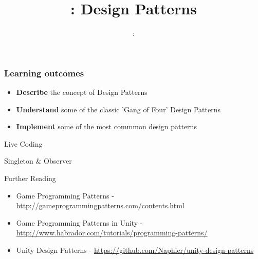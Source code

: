 \usepackage{../../beamerthemeFalmouthGamesAcademy}
\usepackage{multimedia}
\graphicspath{ {../../} }


\usepackage[normalem]{ulem}
\usepackage{wasysym}

\usepackage{pdfpages}

\usetikzlibrary{arrows,automata}




\title{\sessionnumber: Design Patterns}
\subtitle{\modulecode: \moduletitle}

\frame{\titlepage} 

\begin{frame}
	\frametitle{Learning outcomes}
	\begin{itemize}
		\item \textbf{Describe} the concept of Design Patterns
		\item \textbf{Understand} some of the classic 'Gang of Four' Design Patterns
		\item \textbf{Implement} some of the most commmon design patterns
	\end{itemize}
\end{frame}



\begin{frame}{Live Coding}
	\begin{center}
	Singleton \& Observer
	\end{center}
\end{frame}

\begin{frame}{Further Reading}
	\begin{itemize}
		\item Game Programming Patterns - \url{http://gameprogrammingpatterns.com/contents.html}
		\item Game Programming Patterns in Unity - \url{http://www.habrador.com/tutorials/programming-patterns/}
		\item Unity Design Patterns - \url{https://github.com/Naphier/unity-design-patterns}
	\end{itemize}
\end{frame}
